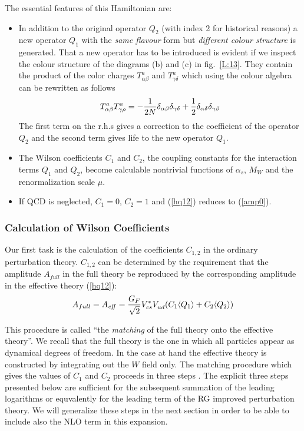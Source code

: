 \documentclass[12pt]{article}
\def\as{\alpha_s}
\newcommand{\eqn}{\ref}
\begin{document}
\begin{itemize}
\begin{itemize}
\begin{itemize}
The essential features of this Hamiltonian are:
\begin{itemize}
\item In addition to the original operator $Q_2$ (with index 2 for 
historical reasons) 
 a new operator $Q_1$ with the {\it same flavour} form
but {\it different colour structure} is generated. 
That a new operator has to be introduced is evident if we
inspect the colour structure of the diagrams (b) and (c) in 
fig.~\ref{L:13}. They contain the
product of the color charges $T^a_{\alpha\beta}$ and 
$T^a_{\gamma\delta}$ which
using the colour algebra can be rewritten as follows
\begin{equation}\label{tata}
T^a_{\alpha\beta}T^a_{\gamma\rho}
=-{1\over 2N}\delta_{\alpha\beta}\delta_{\gamma\delta}+{1\over 2}
\delta_{\alpha\delta}\delta_{\gamma\beta}   \end{equation}
The first term on the r.h.s gives a correction to the coefficient
of the operator $Q_2$ and the second term gives life to the new
operator $Q_1$.
\item The Wilson coefficients $C_1$ and $C_2$, the coupling constants
for the interaction terms $Q_1$ and $Q_2$, become calculable nontrivial
functions of $\as$, $M_W$ and the renormalization scale $\mu$.
\item
If QCD is neglected, $C_1=0$, $C_2=1$ and
(\eqn{hq12}) reduces to (\eqn{amp0}).
\end{itemize}

\subsubsection{Calculation of Wilson Coefficients}
Our first task is the calculation of the coefficients $C_{1, 2}$
in the ordinary perturbation theory.
$C_{1, 2}$ can be  determined
by the requirement that the amplitude $A_{full}$ in the full theory be
reproduced by the corresponding amplitude in the effective theory
(\eqn{hq12}):
\begin{equation}\label{acq}
A_{full}=A_{\it eff}=
{G_F\over\sqrt{2}}V^*_{cs}V_{ud}^{}(C_1\langle Q_1\rangle +
C_2\langle Q_2\rangle)   \end{equation}

This procedure is called ``the {\it matching} of the 
full theory onto the
effective theory''. We recall that the full theory is the one in
which all particles appear as dynamical degrees of freedom.
In the case at hand the effective theory is constructed by
integrating out the $W$ field only. The matching procedure which
gives the values of $C_1$ and $C_2$ proceeds in three steps \cite{BBDM}.
The explicit three steps presented below are sufficient for
the subsequent summation of the leading logarithms or equvalently
for the leading term of the RG improved perturbation theory. 
We will generalize these steps in the next section in order to be able
to include also the NLO term in this expansion.


\end{itemize}
\end{itemize}
\end{itemize}
\end{document}
